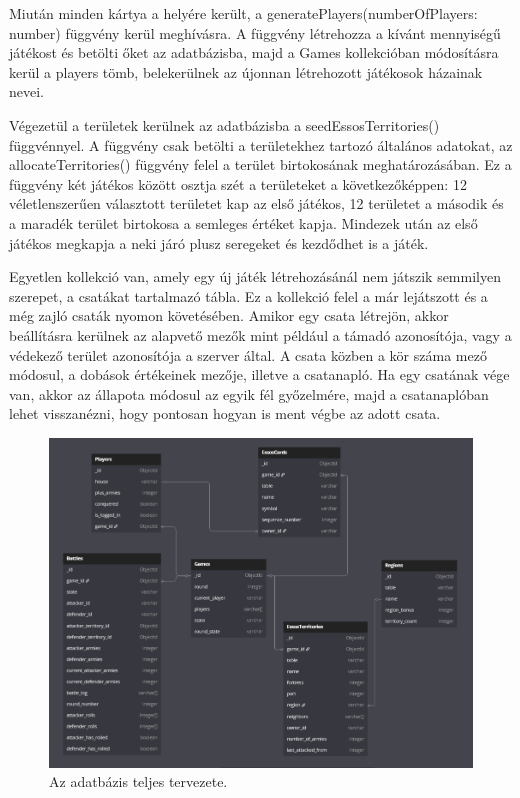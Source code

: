 \documentclass[
]{thesis-ekf}
\theoremstyle{definition}
\theoremstyle{remark}
\begin{document}


Miután minden kártya a helyére került, a generatePlayers(numberOfPlayers: number) függvény kerül meghívásra. A függvény létrehozza a kívánt mennyiségű játékost és betölti őket az adatbázisba, majd a Games kollekcióban módosításra kerül a players tömb, belekerülnek az újonnan létrehozott játékosok házainak nevei.

Végezetül a területek kerülnek az adatbázisba a seedEssosTerritories() függvénnyel. A függvény csak betölti a területekhez tartozó általános adatokat, az allocateTerritories() függvény felel a terület birtokosának meghatározásában. Ez a függvény két játékos között osztja szét a területeket a következőképpen: 12 véletlenszerűen választott területet kap az első játékos, 12 területet a második és a maradék terület birtokosa a semleges értéket kapja. Mindezek után az első játékos megkapja a neki járó plusz seregeket és kezdődhet is a játék.

Egyetlen kollekció van, amely egy új játék létrehozásánál nem játszik semmilyen szerepet, a csatákat tartalmazó tábla. Ez a kollekció felel a már lejátszott és a még zajló csaták nyomon követésében. Amikor egy csata létrejön, akkor beállításra kerülnek az alapvető mezők mint például a támadó azonosítója, vagy a védekező terület azonosítója a szerver által. A csata közben a kör száma mező módosul, a dobások értékeinek mezője, illetve a csatanapló. Ha egy csatának vége van, akkor az állapota módosul az egyik fél győzelmére, majd a csatanaplóban lehet visszanézni, hogy pontosan hogyan is ment végbe az adott csata.

\begin{figure}[ht!]
	\centering
	\includegraphics[width=16cm]{DB.png}
	\caption{Az adatbázis teljes tervezete.}
	\label{database}
\end{figure}
\end{document}
